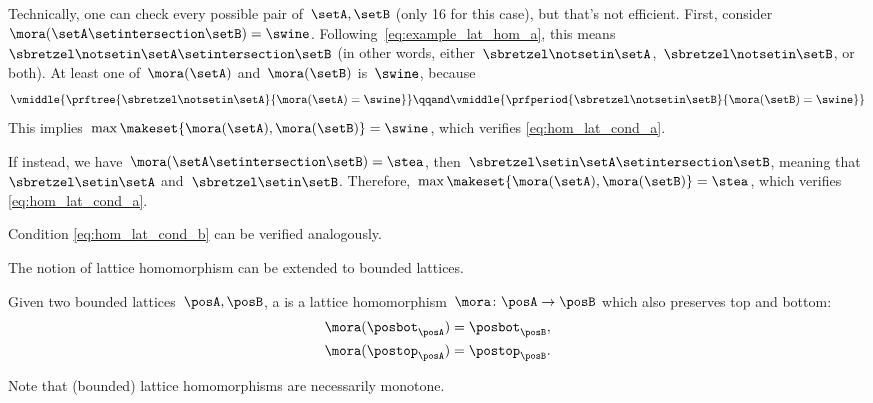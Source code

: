 \begin{example}
Technically, one can check every possible pair of~$\setA,\setB$ (only 16 for this case), but that's not efficient.
First, consider~$\mora(\setA\setintersection \setB)=\swine$.
Following~\cref{eq:example_lat_hom_a}, this means~$\sbretzel \notsetin \setA\setintersection \setB$ (in other words, either~$\sbretzel \notsetin \setA$,~$\sbretzel \notsetin \setB$, or both).
At least one of~$\mora(\setA)$ and~$\mora(\setB)$ is~$\swine$, because
\begin{equation}
    \vmiddle{
        \prftree{
            \sbretzel \notsetin \setA
        }{
            \mora(\setA) = \swine
        }
    }
    \qqand
    \vmiddle{
        \prfperiod{
            \sbretzel \notsetin \setB
        }{
            \mora(\setB) = \swine
        }
    }
\end{equation}
This implies~$\max\makeset{\mora(\setA),\mora(\setB)}=\swine$, which verifies \cref{eq:hom_lat_cond_a}.

If instead, we have~$\mora(\setA\setintersection \setB)=\stea$, then~$\sbretzel \setin \setA\setintersection \setB$, meaning that~$\sbretzel \setin \setA$ and~$\sbretzel \setin \setB$.
Therefore,~$\max\makeset{ \mora(\setA),\mora(\setB)}=\stea$, which verifies \cref{eq:hom_lat_cond_a}.

Condition \cref{eq:hom_lat_cond_b} can be verified analogously.
\end{example}

The notion of lattice homomorphism can be extended to bounded lattices.

\begin{ctdefinition}
    \label{def:bounded_lat_homomorphism}
    Given two bounded lattices~$\posA,\posB$, a \emph{} is a lattice homomorphism~$\mora\colon \posA\to \posB$ which also preserves top and bottom:
    \begin{equation}
        \begin{aligned}
            \mora(\posbot_\posA) & =\posbot_\posB, \\
            \mora(\postop_\posA) & =\postop_\posB.
        \end{aligned}
    \end{equation}
\end{ctdefinition}

Note that (bounded) lattice homomorphisms are necessarily monotone.

